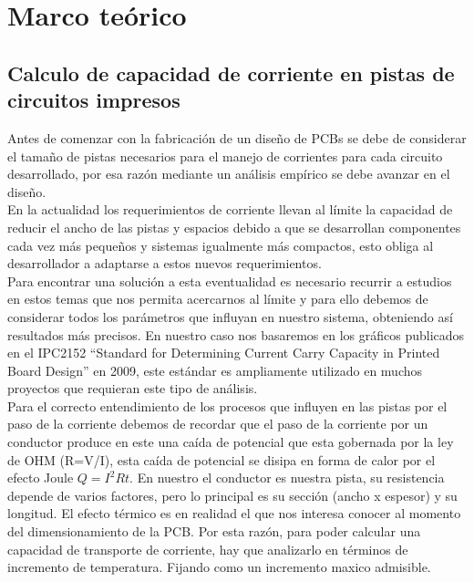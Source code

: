 

\chapter{Marco teórico}

\section{Calculo de capacidad de corriente en pistas de circuitos impresos}



Antes de comenzar con la fabricación de un diseño de PCBs se debe de considerar el tamaño de pistas necesarios para el manejo de corrientes para cada circuito desarrollado, por esa razón mediante un análisis empírico se debe avanzar en el diseño.\\

En la actualidad los requerimientos de corriente llevan al límite la capacidad de reducir el ancho de las pistas y espacios debido a que se desarrollan componentes cada vez más pequeños y sistemas igualmente más compactos, esto obliga al desarrollador a adaptarse a estos nuevos requerimientos.\\

Para encontrar una solución a esta eventualidad es necesario recurrir a estudios en estos temas que nos permita acercarnos al límite y para ello debemos de considerar todos los parámetros que influyan en nuestro sistema, obteniendo así resultados más precisos. En nuestro caso nos basaremos en los gráficos publicados en el IPC2152 ``Standard for Determining Current Carry Capacity in Printed Board Design'' en 2009, este estándar es ampliamente utilizado en muchos proyectos que requieran este tipo de análisis. \\

Para el correcto entendimiento de los procesos que influyen en las pistas por el paso de la corriente debemos de recordar que el paso de la corriente por un conductor produce en este una caída de potencial que esta gobernada por la ley de OHM (R=V/I), esta caída de potencial se disipa en forma de calor por el efecto Joule $Q=I^{2}Rt$. En nuestro el conductor es nuestra pista, su resistencia depende de varios factores, pero lo principal es su sección (ancho x espesor) y su longitud. El efecto térmico es en realidad el que nos interesa conocer al momento del dimensionamiento de la PCB. Por esta razón, para poder calcular una capacidad de transporte de corriente, hay que analizarlo en términos de incremento de temperatura. Fijando como un incremento maxico admisible.\\

